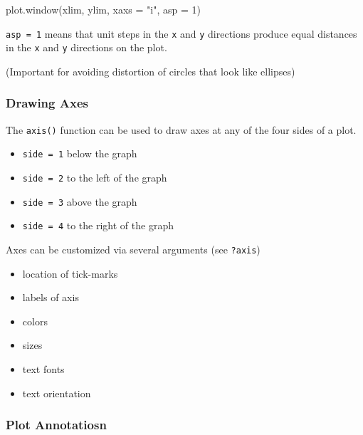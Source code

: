 \documentclass[
]{book}
\newenvironment{Shaded}{\begin{snugshade}}{\end{snugshade}}
\newcommand{\AttributeTok}[1]{\textcolor[rgb]{0.77,0.63,0.00}{#1}}
\newcommand{\DecValTok}[1]{\textcolor[rgb]{0.00,0.00,0.81}{#1}}
\newcommand{\FunctionTok}[1]{\textcolor[rgb]{0.00,0.00,0.00}{#1}}
\newcommand{\NormalTok}[1]{#1}
\newcommand{\StringTok}[1]{\textcolor[rgb]{0.31,0.60,0.02}{#1}}
\begin{document}
\begin{Shaded}
\begin{Highlighting}[]
\FunctionTok{plot.window}\NormalTok{(xlim, ylim, }\AttributeTok{xaxs =} \StringTok{"i"}\NormalTok{, }\AttributeTok{asp =} \DecValTok{1}\NormalTok{)}
\end{Highlighting}
\end{Shaded}

\texttt{asp\ =\ 1} means that unit steps in the \texttt{x} and \texttt{y} directions produce equal
distances in the \texttt{x} and \texttt{y} directions on the plot.

(Important for avoiding distortion of circles that look like ellipses)

\hypertarget{drawing-axes}{%
\subsubsection*{Drawing Axes}\label{drawing-axes}}

The \texttt{axis()} function can be used to draw axes at any of the four sides of a plot.

\begin{itemize}
\item
  \texttt{side\ =\ 1} below the graph
\item
  \texttt{side\ =\ 2} to the left of the graph
\item
  \texttt{side\ =\ 3} above the graph
\item
  \texttt{side\ =\ 4} to the right of the graph
\end{itemize}

Axes can be customized via several arguments (see \texttt{?axis})

\begin{itemize}
\item
  location of tick-marks
\item
  labels of axis
\item
  colors
\item
  sizes
\item
  text fonts
\item
  text orientation
\end{itemize}

\hypertarget{plot-annotatiosn}{%
\subsubsection*{Plot Annotatiosn}\label{plot-annotatiosn}}
\end{document}
